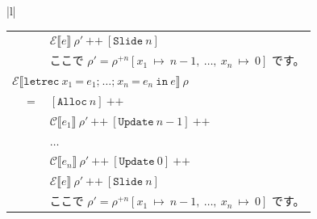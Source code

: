 \documentclass{jbook}
\begin{document}
\begin{tabular} {|l|}
\begin{tabular}{r c l}
		                                                                         &     & $\mathcal{E} \llbracket e \rrbracket ~ \rho' ~ \texttt{++} ~ \left[\texttt{Slide} ~ n\right]$                                                                                                \\
		                                                                         &     & ここで $\rho' = \rho^{+n} \left[x_1 ~ \mapsto ~ n - 1, ~ \ldots , ~ x_n ~ \mapsto ~ 0\right]$ です。                                                                                         \\
		\multicolumn{3}{l}{$\mathcal{E} \llbracket \texttt{letrec} ~ x_1 ~ \texttt{=} ~ e_1\texttt{;} ~  \ldots \texttt{;} ~ x_n ~ \texttt{=} ~ e_n ~ \texttt{in} ~ e \rrbracket ~ \rho$}                                                                                             \\
		                                                                         & $=$ & $\left[\texttt{Alloc} ~ n\right] ~ \texttt{++}$                                                                                                                                              \\
		                                                                         &     & $\mathcal{C} \llbracket e_1 \rrbracket ~ \rho' ~ \texttt{++} ~ \left[\texttt{Update} ~ n - 1\right] ~ \texttt{++}$                                                                           \\
		                                                                         &     & $\ldots$                                                                                                                                                                                     \\
		                                                                         &     & $\mathcal{C} \llbracket e_n \rrbracket ~ \rho' ~ \texttt{++} ~ \left[\texttt{Update} ~ 0\right] ~ \texttt{++}$                                                                               \\
		                                                                         &     & $\mathcal{E} \llbracket e \rrbracket ~ \rho' ~ \texttt{++} ~ \left[\texttt{Slide} ~ n\right]$                                                                                                \\
		                                                                         &     & ここで $\rho' = \rho^{+n} \left[x_1 ~ \mapsto ~ n - 1, ~ \ldots , ~ x_n ~ \mapsto ~ 0\right]$ です。                                                                                         \\

\end{tabular}
\end{tabular}
\end{document}
